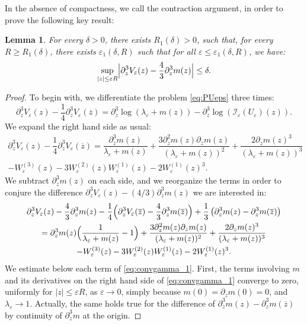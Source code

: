 \documentclass[JEP,XML,SOM,Unicode]{cedram}
\let\mathcal\mathscr
\newcommand{\cI}{\mathcal{I}}
\theoremstyle{plain}
\newtheorem{lem}[thm]{Lemma}
\theoremstyle{definition}
\let\eps\varepsilon
\newcommand{\abs}[1]{\left\lvert#1\right\rvert}
\newcommand{\Babs}[1]{\Bigl\lvert#1\Bigr\rvert}
\newcommand{\bz}{\overline{z}}
\begin{document}
In the absence of compactness, we call the contraction argument, in order to prove the following key result:

\begin{lem}\label{lem:last contraction}
For every $\delta\!>\!0$, there exists $R_1(\delta)\!>\!0$, such that, for every \hbox{$R\!\geq\!R_1(\delta)$}, there exists $\eps_1(\delta,R)$ such that for all $\eps \leq \eps_1(\delta,R)$, we have:
\begin{equation}\label{eq:convgamma_obj}
\sup_{ \abs{z} \leq \eps R} \Babs{ \partial_z^3 V_\eps(z) - \frac43 \partial_z^3 m(z) } \leq \delta.
\end{equation}
\end{lem}

\begin{proof}
To begin with, we differentiate the problem \eqref{eq:PUeps} three times:
\begin{equation*}
\partial_z^3 V_\eps(z) - \dfrac{1}{4}\partial_z^3 V_\eps(\bz) = \partial_z^3 \log\left (\lambda_\eps + m(z)\right) - \partial_z^3 \log\left (\cI_\eps(U_\eps)(z) \right).
\end{equation*}
We expand the right hand side as usual:
\begin{multline*}
\partial_z^3 V_\eps(z) - \dfrac{1}{4} \partial_z^3 V_\eps(\bz) = \dfrac{\partial^3_z m(z)}{\lambda_\eps +m(z)}+\dfrac{3 \partial^2_z m(z)\partial_z m(z)}{(\lambda_\eps +m(z))^2}
+\dfrac{2 \partial_z m(z	)^3}{(\lambda_\eps +m(z))^3} \\ - W_\eps^{(3)}(z)- 3W_\eps^{(2)}(z)W_\eps^{(1)}(z)-2W_\eps^{(1)}(z)^3.
\end{multline*}
We subtract $\partial_z^3 m(z)$ on each side, and we reorganize the terms in order to conjure the difference $\partial_z^3 V_\eps(z) - (4/3) \partial_z^3 m(z)$ we are interested in:
\begin{multline}\label{eq:convgamma_1}
\partial_z^3 V_\eps(z) - \frac43 \partial_z^3 m(z) - \dfrac{1}{4}\Bigl(\partial_z^3 V_\eps(\bz)-\frac43 \partial_z^3 m(\bz) \Bigr) + \dfrac{1}{3} \left(\partial_z^3 m(z) - \partial_z^3 m(\bz)\right)\\
=\partial^3_z m(z) \Bigl(\dfrac{1}{\lambda_\eps +m(z)}-1 \Bigr) + \dfrac{3 \partial^2_z m(z)\partial_z m(z)}{(\lambda_\eps +m(z))^2}
+\dfrac{2 \partial_z m(z	)^3}{(\lambda_\eps +m(z))^3}\\ - W_\eps^{(3)}(z)- 3W_\eps^{(2)}(z)W_\eps^{(1)}(z)-2W_\eps^{(1)}(z)^3.
\end{multline}
We estimate below each term of \eqref{eq:convgamma_1}.
First, the terms involving $m$ and its derivatives on the right hand side of \eqref{eq:convgamma_1} converge to zero, uniformly for $|z|\leq \eps R$, as $\eps\to 0$, simply because $m(0) = \partial_z m(0)= 0$, and $\lambda_\eps\to 1$.
Actually, the same holds true for the difference of $ \partial_z^3 m(z) - \partial_z^3 m(\bz)$ by continuity of $\partial_z^3m$ at the origin.


\end{proof}
\end{document}
